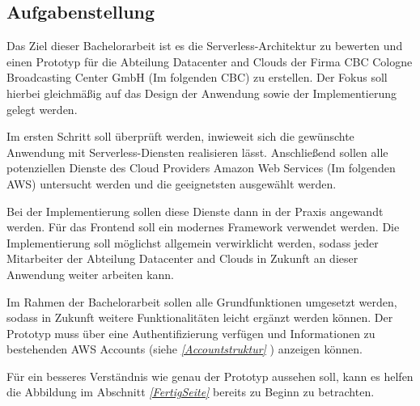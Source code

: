 \subsection{Aufgabenstellung}

Das Ziel dieser Bachelorarbeit ist es die Serverless-Architektur zu bewerten und einen Prototyp für die Abteilung Datacenter and Clouds der Firma CBC Cologne Broadcasting Center GmbH (Im folgenden \glqq CBC\grqq) zu erstellen.
Der Fokus soll hierbei gleichmäßig auf das Design der Anwendung sowie der Implementierung gelegt werden.

Im ersten Schritt soll überprüft werden, inwieweit sich die gewünschte Anwendung mit Serverless-Diensten realisieren lässt.
Anschließend sollen alle potenziellen Dienste des Cloud Providers Amazon Web Services (Im folgenden \glqq AWS\grqq) untersucht werden und die geeignetsten ausgewählt werden.

Bei der Implementierung sollen diese Dienste dann in der Praxis angewandt werden. Für das Frontend soll ein modernes Framework verwendet werden.
Die Implementierung soll möglichst allgemein verwirklicht werden, sodass jeder Mitarbeiter der Abteilung Datacenter and Clouds in Zukunft an dieser Anwendung weiter arbeiten kann.

Im Rahmen der Bachelorarbeit sollen alle Grundfunktionen umgesetzt werden, sodass in Zukunft weitere Funktionalitäten leicht ergänzt werden können.
Der Prototyp muss über eine Authentifizierung verfügen und Informationen zu bestehenden AWS Accounts (siehe \textit{\ref{Accountstruktur} }) anzeigen können.

Für ein besseres Verständnis wie genau der Prototyp aussehen soll, kann es helfen die Abbildung im Abschnitt \textit{\ref{FertigSeite} } bereits zu Beginn zu betrachten.

